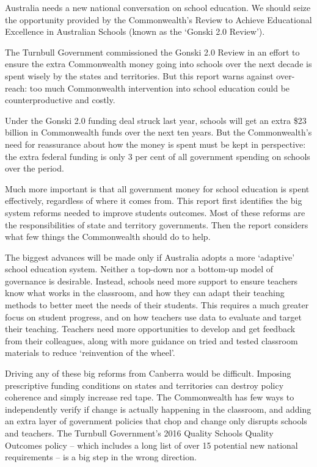 \begin{overview}
Australia needs a new national conversation on school education. We should seize the opportunity provided by the Commonwealth's Review to Achieve Educational Excellence in Australian Schools (known as the `Gonski 2.0 Review'). 

The Turnbull Government commissioned the Gonski 2.0 Review in an effort to ensure the extra Commonwealth money going into schools over the next decade is spent wisely by the states and territories. But this report warns against over-reach: too much Commonwealth intervention into school education could be counterproductive and costly.

Under the Gonski 2.0 funding deal struck last year, schools will get an extra \$23 billion in Commonwealth funds over the next ten years. 
But the Commonwealth's need for reassurance about how the money is spent must be kept in perspective: the extra federal funding is only 3 per cent of all government spending on schools over the period. 

Much more important is that all government money for school education is spent effectively, regardless of where it comes from. This report first identifies the big system reforms needed to improve students outcomes. Most of these reforms are the responsibilities of state and territory governments. Then the report considers what few things the Commonwealth should do to help. 

The biggest advances will be made only if Australia adopts a more `adaptive' school education system. Neither a top-down nor a bottom-up model of governance is desirable. Instead, schools need more support to ensure teachers know what works in the classroom, and how they can adapt their teaching methods to better meet the needs of their students. This requires a much greater focus on student progress, and on how teachers use data to evaluate and target their teaching. Teachers need more opportunities to develop and get feedback from their colleagues, along with more guidance on tried and tested classroom materials to reduce `reinvention of the wheel'.

Driving any of these big reforms from Canberra would be difficult. Imposing prescriptive funding conditions on states and territories can destroy policy coherence and simply increase red tape. The Commonwealth has few ways to independently verify if change is actually happening in the classroom, and adding an extra layer of government policies that chop and change only disrupts schools and teachers. The Turnbull Government's 2016 Quality Schools Quality Outcomes policy -- which includes a long list of over 15 potential new national requirements -- is a big step in the wrong direction. 


\end{overview}
